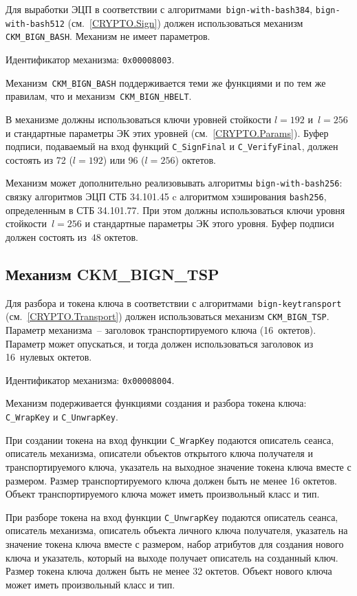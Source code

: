 Для выработки  ЭЦП в соответствии с 
алгоритмами~\texttt{bign-with-bash384}, \texttt{bign-with-bash512} 
(см.~\ref{CRYPTO.Sign}) должен использоваться механизм 
\verb|CKM_BIGN_BASH|.
%
Механизм не имеет параметров.

Идентификатор механизма: \texttt{0x00008003}.

Механизм~\verb|CKM_BIGN_BASH| поддерживается теми же функциями и по тем же 
правилам, что и механизм~\verb|CKM_BIGN_HBELT|.

В механизме должны использоваться ключи уровней стойкости $l=192$ и~$l=256$
и стандартные параметры ЭК этих уровней (см.~\ref{CRYPTO.Params}).
% 
Буфер подписи, подаваемый на вход функций \verb|C_SignFinal| и 
\verb|C_VerifyFinal|, должен состоять из 72 ($l=192$) или 96 ($l=256$) 
октетов. 

Механизм может дополнительно реализовывать алгоритмы 
\texttt{bign-with-bash256}: связку алгоритмов ЭЦП СТБ 34.101.45 c 
алгоритмом хэширования \texttt{bash256}, определенным в СТБ 34.101.77.
При этом должны использоваться ключи уровня стойкости~$l=256$
и стандартные параметры ЭК этого уровня. 
Буфер подписи должен состоять из~$48$ октетов.

\subsection{Механизм CKM\_BIGN\_TSP}\label{CRYPTOKI.Transport}


Для разбора и 
токена ключа в соответствии с алгоритмами~\texttt{bign-keytransport}
(см.~\ref{CRYPTO.Transport}) должен использоваться механизм \verb|CKM_BIGN_TSP|. 
%
Параметр механизма~-- заголовок транспортируемого ключа (16~октетов). 
Параметр может опускаться, и тогда должен использоваться
заголовок из 16~нулевых октетов.

Идентификатор механизма: \texttt{0x00008004}.

Механизм подерживается функциями создания и разбора токена ключа:
\verb|C_WrapKey| и \verb|C_UnwrapKey|.

При создании токена на вход функции \verb|C_WrapKey| подаются
описатель сеанса, описатель механизма, описатели объектов открытого ключа
получателя и транспортируемого ключа, указатель на
выходное значение токена ключа вместе с размером.
Размер транспортируемого ключа должен быть не менее 16 октетов.
Объект транспортируемого ключа может иметь произвольный класс и тип.

При разборе токена на вход функции \verb|C_UnwrapKey| подаются
описатель сеанса, описатель механизма, описатель объекта личного ключа
получателя, указатель на значение токена ключа вместе с размером,
набор атрибутов для создания нового ключа и указатель,
который на выходе получает описатель на созданный ключ.
Размер токена ключа должен быть не менее 32 октетов.
Объект нового ключа может иметь произвольный класс и тип.

